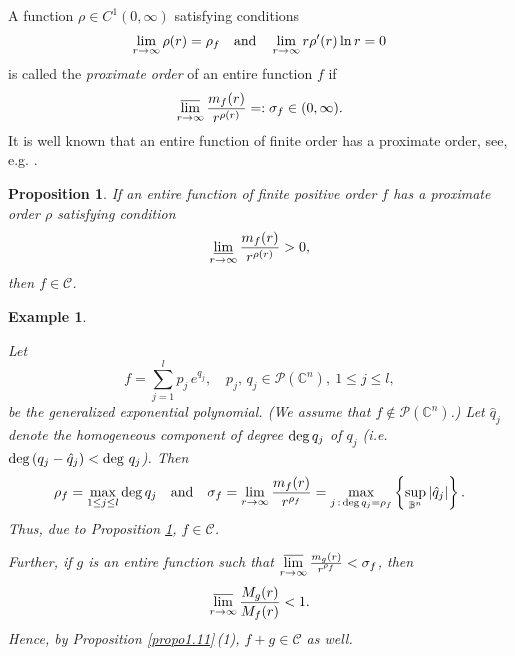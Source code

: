 \documentclass[11pt, oneside]{amsart}
\newtheorem{Proposition}[Th]{Proposition}
\newtheorem{E}[Th]{Example}
\begin{document}
A function $\rho\in C^1(0,\infty)$ satisfying 
conditions
\[
\lim_{r\rightarrow\infty}\rho(r)=\rho_f\quad {\rm and}\quad \lim_{r\rightarrow\infty} r\rho'(r)\ln r=0
\]
is called the  {\em proximate order} of an entire function  $f$ if
\[
\varlimsup_{r\rightarrow\infty}\frac{m_f(r)}{r^{\rho(r)}}=:\sigma_f\in (0,\infty).
\]
It is well known that an entire function of finite order has a proximate order, see, e.g. \cite[Th.\,I.16]{L}.
\begin{Proposition}\label{prop1.9}
If an entire function of finite positive order $f$ has a proximate order $\rho$ satisfying condition
\[
\varliminf_{r\rightarrow\infty}\frac{m_f(r)}{r^{\rho(r)}}>0,
\]
then $f\in\mathscr C$.
\end{Proposition}
\begin{E}\label{ex1.10}
{\rm Let
\[
f=\sum_{j=1}^l p_j\, e^{q_j},\quad p_j,\, q_j\in\mathcal P(\mathbb C^n),\ 1\le j\le l,
\]
be the generalized exponential polynomial. (We assume that $f\not\in \mathcal P(\mathbb C^n)$.) Let
$\hat q_j$ denote the homogeneous component of degree ${\rm deg}\, q_j$ of $q_j$ (i.e. ${\rm deg}\, (q_j-\hat q_j)<\deg\, q_j$). 
Then
\[
\rho_f=\max_{1\le j\le l}{\rm deg}\, q_j\quad {\rm and }\quad \sigma_f=\lim_{r\rightarrow\infty}\frac{m_f(r)}{r^{\rho_f}}=\max_{j\,:\, {\rm deg}\, q_j=\rho_f}\left\{\sup_{\mathbb B^n}|\hat q_j|\right\}.
\]
Thus, due to Proposition \ref{prop1.9},  $f\in\mathscr C$. 

Further, if $g$ is an entire function such that $\displaystyle \varlimsup_{r\rightarrow\infty}\mbox{$\frac{m_g(r)}{r^{\rho_f}}$}<\sigma_f$, then 
\[
\varlimsup_{r\rightarrow\infty}\frac{M_{g}(r)}{ M_f(r)}<1.
\]
Hence, by Proposition \ref{propo1.11}\,(1), $f+g\in\mathscr C$ as well.
}
\end{E}
\end{document}
